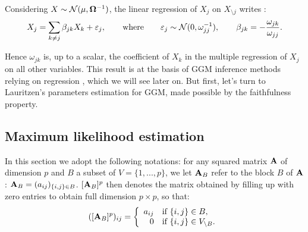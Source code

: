 \begin{prop}\label{ggm:reg}
 Considering $X\sim \mathcal{N}(\mu, {\boldsymbol{\Omega}}^{-1})$, the linear regression of  $X_j$ on $X_{\setminus j}$ writes :
$$X_j = \sum_{k\neq j} \beta_{jk} X_k + \varepsilon_j,\qquad \text{where}\qquad\varepsilon_j \sim \mathcal{N} (0, \omega_{jj}^{-1}), \qquad \beta_{jk} = -\frac{\omega_{jk}}{\omega_{jj}}.$$

\end{prop}
Hence $\omega_{jk}$ is, up to a scalar, the coefficient of $X_k$ in the multiple regression of $X_j$ on all other variables. This result is at the basis of GGM inference methods relying on regression \citep{MeB06}, which we will see later on. But first, let's turn to Lauritzen's  parameters estimation for GGM, made possible by the faithfulness property.

 \subsection{Maximum likelihood estimation}\label{ggm:mle}
In this section we adopt the following notations: for any  squared  matrix ${\bf A}$ of dimension $p$ and $B$ a subset of $V=\{1,...,p\}$, we let ${\bf A}_B$ refer to the block $B$ of ${\bf A}$: ${\bf A}_{B}=(a_{ij})_{\{i,j\}\in B}$.   $[{\bf A}_B]^p$ then denotes the matrix obtained by filling up with zero entries to obtain full dimension $p\times p$, so that:
$$([{\bf A}_B]^p )_{ij}=\left\{ \begin{array}{rl}
a_{ij} & \text{if } \{i,j\}\in B,\\
0 &  \text{if } \{i,j\}\in V_{\setminus B}.
\end{array}\right.$$


